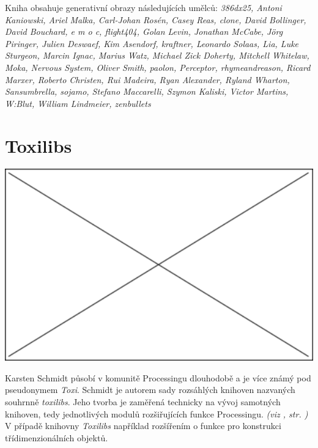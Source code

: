 \documentclass[10pt]{book}
\newcommand{\oddil}[1]{\section{#1}\index{#1}\label{#1}}
\newcommand{\odkaz}[1]{\textit{(viz \nameref{#1}, str. \pageref*{#1})}}
\begin{document}
Kniha obsahuje generativní obrazy následujících umělců:
{\em 
386dx25, Antoni Kaniowski, Ariel Malka, Carl-Johan Rosén, Casey Reas, clone, David Bollinger, David Bouchard, e m o c, flight404, Golan Levin, Jonathan McCabe, Jörg Piringer, Julien Deswaef, Kim Asendorf, kraftner, Leonardo Solaas, Lia, Luke Sturgeon, Marcin Ignac, Marius Watz, Michael Zick Doherty, Mitchell Whitelaw, Moka, Nervous System, Oliver Smith, paolon, Perceptor, rhymeandreason, Ricard Marxer, Roberto Christen, Rui Madeira, Ryan Alexander, Ryland Wharton, Sansumbrella, sojamo, Stefano Maccarelli, Szymon Kaliski, Victor Martins, W:Blut, William Lindmeier, zenbullets} 




\newpage
\oddil{Toxilibs}


\begin{center}
\includegraphics[width = 1\textwidth]{imgs/neznamy.png}

\end{center}


Karsten Schmidt působí v komunitě Processingu dlouhodobě a je více známý pod pseudonymem {\em Toxi}. Schmidt je autorem sady rozsáhlých knihoven nazvaných souhrnně {\em toxilibs}. Jeho tvorba je zaměřená technicky na vývoj samotných knihoven, tedy jednotlivých modulů rozšiřujících funkce Processingu. \odkaz{Knihovny} V případě knihovny {\em Toxilibs} například rozšířením o funkce pro konstrukci třídimenzionálních objektů. 
\end{document}
